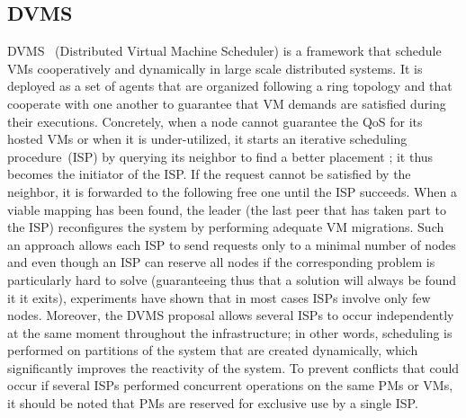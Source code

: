 

\subsection{DVMS}

DVMS~\cite{quesnel:ispa2013,quesnel:cpe2012}
(Distributed Virtual Machine Scheduler) is a framework that schedule VMs
cooperatively and dynamically in large scale distributed
systems. It is deployed as a set of agents that are organized following a ring
topology and that cooperate with one another to guarantee that VM demands are satisfied during their executions. 
Concretely, when a node cannot guarantee the QoS for its hosted VMs or when it is
under-utilized, it starts an iterative scheduling procedure~(ISP) by querying
its neighbor to find a better placement ; it thus becomes the initiator of the ISP.
If the request cannot be satisfied by the neighbor, it is forwarded to the
following free one until the ISP succeeds. When a viable mapping has been
found, the leader (\ie the last peer that has taken part to the ISP) reconfigures 
the system by performing adequate VM migrations.
Such an approach allows each ISP to send requests only to a minimal number of
nodes and even though an ISP can reserve all nodes if the corresponding problem
is particularly hard to solve (guaranteeing thus that a solution will always be
found it it exits), experiments have shown that in most cases ISPs involve only
few nodes.  Moreover, the DVMS proposal allows several ISPs to occur
independently at the same moment throughout the infrastructure; in other words,
scheduling is performed on partitions of the system that are created
dynamically, which significantly improves the reactivity of the system.  To
prevent conflicts that could occur if several ISPs performed concurrent
operations on the same PMs or VMs, it should be noted that PMs are reserved for
exclusive use by a single ISP. 

